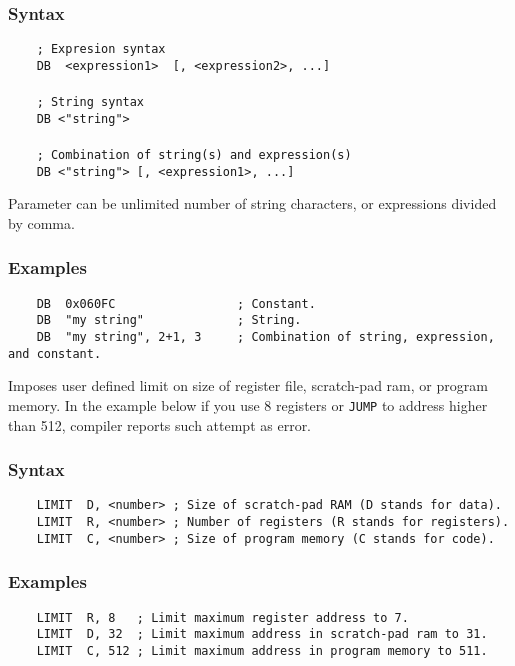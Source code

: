    \subsubsection{Syntax}
        \verb'    ; Expresion syntax'\\
        \verb'    DB  <expression1>  [, <expression2>, ...]'\\
        \verb''\\
        \verb'    ; String syntax'\\
        \verb'    DB <"string">'\\
        \verb''\\
        \verb'    ; Combination of string(s) and expression(s)'\\
        \verb'    DB <"string"> [, <expression1>, ...]'

        Parameter can be unlimited number of string characters, or expressions divided by comma.


    \subsubsection{Examples}
        \verb'    DB  0x060FC                 ; Constant.'\\
        \verb'    DB  "my string"             ; String.'\\
        \verb'    DB  "my string", 2+1, 3     ; Combination of string, expression, and constant.'

    Imposes user defined limit on size of register file, scratch-pad ram, or program memory. In the example below if you use 8 registers or \texttt{JUMP} to address higher than 512, compiler reports such attempt as error.

    \subsubsection{Syntax}
        \verb'    LIMIT  D, <number> ; Size of scratch-pad RAM (D stands for data).'\\
        \verb'    LIMIT  R, <number> ; Number of registers (R stands for registers).'\\
        \verb'    LIMIT  C, <number> ; Size of program memory (C stands for code).'

    \subsubsection{Examples}
        \verb'    LIMIT  R, 8   ; Limit maximum register address to 7.'\\
        \verb'    LIMIT  D, 32  ; Limit maximum address in scratch-pad ram to 31. '\\
        \verb'    LIMIT  C, 512 ; Limit maximum address in program memory to 511.'

